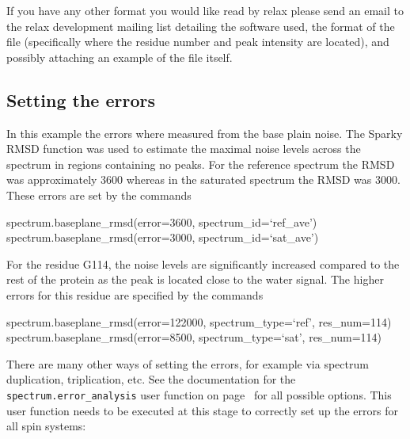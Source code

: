 If you have any other format you would like read by relax please send an email to the relax development mailing list detailing the software used, the format of the file (specifically where the residue number and peak intensity are located), and possibly attaching an example of the file itself.




\subsection{Setting the errors}

In this example the errors where measured from the base plain noise.  The Sparky RMSD function was used to estimate the maximal noise levels across the spectrum in regions containing no peaks.  For the reference spectrum the RMSD was approximately 3600 whereas in the saturated spectrum the RMSD was 3000.  These errors are set by the commands

\begin{exampleenv}
spectrum.baseplane\_rmsd(error=3600, spectrum\_id=`ref\_ave') \\
spectrum.baseplane\_rmsd(error=3000, spectrum\_id=`sat\_ave')
\end{exampleenv}

For the residue G114, the noise levels are significantly increased compared to the rest of the protein as the peak is located close to the water signal.  The higher errors for this residue are specified by the commands

\begin{exampleenv}
spectrum.baseplane\_rmsd(error=122000, spectrum\_type=`ref', res\_num=114) \\
spectrum.baseplane\_rmsd(error=8500, spectrum\_type=`sat', res\_num=114)
\end{exampleenv}

There are many other ways of setting the errors, for example via spectrum duplication, triplication, etc.  See the documentation for the \texttt{spectrum.error\_analysis} user function on page~\pageref{uf: spectrum.error_analysis} for all possible options.  This user function needs to be executed at this stage to correctly set up the errors for all spin systems:




